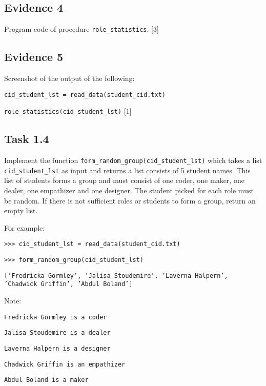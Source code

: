 \subsection*{Evidence 4 }

Program code of procedure \texttt{role\_statistics}.\hfill{} {[}3{]}

\subsection*{Evidence 5}

Screenshot of the output of the following: 

\noindent %
\noindent\begin{minipage}[t]{1\columnwidth}%
\texttt{cid\_student\_lst = read\_data(\textquotedbl student\_cid.txt\textquotedbl ) }

\texttt{role\_statistics(cid\_student\_lst)}\hfill{} {[}1{]}%
\end{minipage}

\subsection*{Task 1.4 }

Implement the function \texttt{form\_random\_group(cid\_student\_lst)}
which takes a list \texttt{cid\_student\_lst} as input and returns
a list consists of 5 student names. This list of students forms a
group and must consist of one coder, one maker, one dealer, one empathizer
and one designer. The student picked for each role must be random.
If there is not sufficient roles or students to form a group, return
an empty list. 

For example: 

\noindent %
\noindent\begin{minipage}[t]{1\columnwidth}%
\texttt{>\textcompwordmark >\textcompwordmark > cid\_student\_lst
= read\_data(\textquotedbl student\_cid.txt\textquotedbl ) }

\texttt{>\textcompwordmark >\textcompwordmark > form\_random\_group(cid\_student\_lst) }

\texttt{{[}'Fredricka Gormley', 'Jalisa Stoudemire', 'Laverna Halpern',
'Chadwick Griffin', 'Abdul Boland'{]} }%
\end{minipage}

Note: 

\noindent %
\noindent\begin{minipage}[t]{1\columnwidth}%
\texttt{Fredricka Gormley is a coder }

\texttt{Jalisa Stoudemire is a dealer}

\texttt{Laverna Halpern is a designer }

\texttt{Chadwick Griffin is an empathizer }

\texttt{Abdul Boland is a maker}%
\end{minipage}

